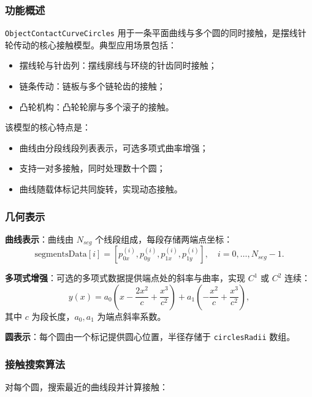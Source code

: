 \documentclass[12pt]{ctexart}
\begin{document}
\subsubsection{功能概述}

\texttt{ObjectContactCurveCircles} 用于一条平面曲线与多个圆的同时接触，是摆线针轮传动的核心接触模型。典型应用场景包括：
\begin{itemize}
  \item 摆线轮与针齿列：摆线廓线与环绕的针齿同时接触；
  \item 链条传动：链板与多个链轮齿的接触；
  \item 凸轮机构：凸轮轮廓与多个滚子的接触。
\end{itemize}

该模型的核心特点是：
\begin{itemize}
  \item 曲线由分段线段列表表示，可选多项式曲率增强；
  \item 支持一对多接触，同时处理数十个圆；
  \item 曲线随载体标记共同旋转，实现动态接触。
\end{itemize}

\subsubsection{几何表示}

\textbf{曲线表示}：曲线由 $N_{seg}$ 个线段组成，每段存储两端点坐标：
\begin{equation}
\text{segmentsData}[i] = [p_{0x}^{(i)}, p_{0y}^{(i)}, p_{1x}^{(i)}, p_{1y}^{(i)}], \quad i = 0, \ldots, N_{seg}-1.
\end{equation}

\textbf{多项式增强}：可选的多项式数据提供端点处的斜率与曲率，实现 $C^1$ 或 $C^2$ 连续：
\begin{equation}
y(x) = a_0 \left(x - \frac{2x^2}{c} + \frac{x^3}{c^2}\right) + a_1 \left(-\frac{x^2}{c} + \frac{x^3}{c^2}\right),
\end{equation}
其中 $c$ 为段长度，$a_0, a_1$ 为端点斜率系数。

\textbf{圆表示}：每个圆由一个标记提供圆心位置，半径存储于 \verb|circlesRadii| 数组。

\subsubsection{接触搜索算法}

对每个圆，搜索最近的曲线段并计算接触：
\end{document}
